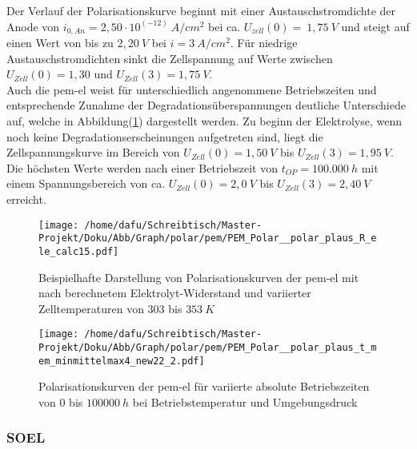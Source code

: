 \documentclass[onecolumn,10pt,titlepage]{article}
\begin{document}
Der Verlauf der Polarisationskurve beginnt mit einer Austauschstromdichte der Anode von $i_{0,An}=2,50\cdot10^{(-12)}~A/cm^2 $ bei ca. $U_{zell}(0)=~1,75~V$ und steigt auf einen Wert von bis zu $2,20~V$ bei $i=3~A/cm^2$. Für niedrige Austauschstromdichten sinkt die Zellspannung auf Werte zwischen  $U_{Zell}(0)=1,30$ und $U_{Zell}(3)=1,75~V$.\\
Auch die \gls{pem}-\gls{el} weist für unterschiedlich angenommene Betriebszeiten und entsprechende Zunahme der Degradationsüberspannungen deutliche Unterschiede auf, welche in Abbildung(\ref{fig:polk_PEM_tmemvar}) dargestellt werden. Zu beginn der Elektrolyse, wenn noch keine Degradationserscheinungen aufgetreten sind, liegt die Zellspannungskurve im Bereich von  $U_{Zell}(0)=1,50~V$ bis $U_{Zell}(3)=1,95~V$. Die höchsten Werte werden nach einer Betriebszeit von $t_{OP}=100.000~h$ mit einem Spannungsbereich von ca. $U_{Zell}(0)=2,0~V$ bis $U_{Zell}(3)=2,40~V$ erreicht.

\begin{figure}[!tbp]
	\centering
	\begin{minipage}[t]{0.49\textwidth}
		\texttt{[image: /home/dafu/Schreibtisch/Master-Projekt/Doku/Abb/Graph/polar/pem/PEM\_Polar\_\_polar\_plaus\_R\_ele\_calc15.pdf]}
		
		\caption[Beispielhafte Darstellung von Polarisationskurven der \gls{pem}-\gls{el}bzgl.Elektrolyt-Widerstand]{Beispielhafte Darstellung von Polarisationskurven der \gls{pem}-\gls{el} mit nach \cite{Chandesris2015} berechnetem Elektrolyt-Widerstand und variierter Zelltemperaturen von $303$ bis $353~K$}
		\label{fig:polk_PEM_Tvar_ReleCalc} 
	\end{minipage}
	\hfill
	\begin{minipage}[t]{0.49\textwidth}
		\texttt{[image: /home/dafu/Schreibtisch/Master-Projekt/Doku/Abb/Graph/polar/pem/PEM\_Polar\_\_polar\_plaus\_t\_mem\_minmittelmax4\_new22\_2.pdf]}
		
		\caption[Polarisationskurven der \gls{pem}-\gls{el} für variierte absolute Betriebszeiten]{Polarisationskurven der \gls{pem}-\gls{el} für variierte absolute Betriebszeiten von $0$ bis $100000~h$ bei Betriebstemperatur und Umgebungsdruck}
		\label{fig:polk_PEM_tmemvar} 
	\end{minipage}
\end{figure}



\subsubsection*{SOEL}
\end{document}
